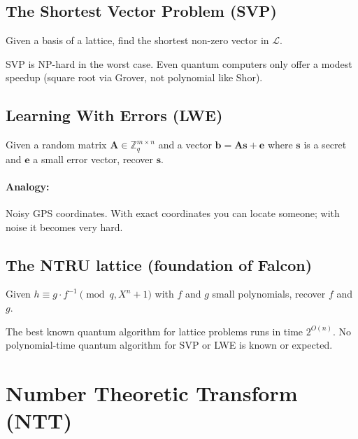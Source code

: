 \documentclass[11pt,a4paper]{article}
\begin{document}
\subsection{The Shortest Vector Problem (SVP)}

\begin{warningbox}
Given a basis of a lattice, find the shortest non-zero vector in $\mathcal{L}$.
\end{warningbox}

SVP is NP-hard in the worst case. Even quantum computers only offer a modest speedup (square root via Grover, not polynomial like Shor).

\subsection{Learning With Errors (LWE)}

\begin{infobox}
Given a random matrix $\mathbf{A} \in \mathbb{Z}_q^{m \times n}$ and a vector $\mathbf{b} = \mathbf{A}\mathbf{s} + \mathbf{e}$ where $\mathbf{s}$ is a secret and $\mathbf{e}$ a small error vector, recover $\mathbf{s}$.
\end{infobox}

\paragraph{Analogy:} Noisy GPS coordinates. With exact coordinates you can locate someone; with noise it becomes very hard.

\subsection{The NTRU lattice (foundation of Falcon)}

\begin{infobox}
Given $h \equiv g \cdot f^{-1} \pmod{q, X^n+1}$ with $f$ and $g$ small polynomials, recover $f$ and $g$.
\end{infobox}

\begin{resultbox}
The best known quantum algorithm for lattice problems runs in time $2^{O(n)}$. No polynomial-time quantum algorithm for SVP or LWE is known or expected.
\end{resultbox}

\section{Number Theoretic Transform (NTT)}
\end{document}
